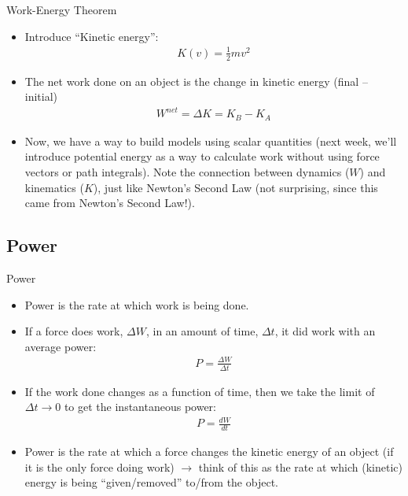 \documentclass[aspectratio=169,
hyperref={colorlinks,urlcolor=blue}
]{beamer}
\begin{document}
\begin{frame}{Work-Energy Theorem}
\begin{itemize}
\item Introduce ``Kinetic energy'':
\begin{align*}
K(v)=\frac{1}{2}mv^2
\end{align*}
\item The net work done on an object is the change in kinetic energy (final – initial)
\begin{align*}
W^{net} = \Delta K = K_B-K_A
\end{align*}
\item Now, we have a way to build models using scalar quantities (next week, we’ll introduce potential energy as a way to calculate work without using force vectors or path integrals). Note the connection between dynamics ($W$) and kinematics ($K$), just like Newton's Second Law (not surprising, since this came from Newton's Second Law!).
\end{itemize}
\end{frame}




\subsection{Power}
\label{subsec:power}
\begin{frame}{Power}
\begin{itemize}
\item Power is the rate at which work is being done.
\item If a force does work, $\Delta W$, in an amount of time, $\Delta t$, it did work with an average power:
\begin{align*}
P=\frac{\Delta W}{\Delta t}
\end{align*}
\item If the work done changes as a function of time, then we take the limit of $\Delta t\to 0$ to get the instantaneous power:
\begin{align*}
P=\frac{d W}{d t}
\end{align*}
\item Power is the rate at which a force changes the kinetic energy of an object (if it is the only force doing work) $\rightarrow$ think of this as the rate at which (kinetic) energy is being ``given/removed'' to/from the object.
\end{itemize}
\end{frame}
\end{document}
